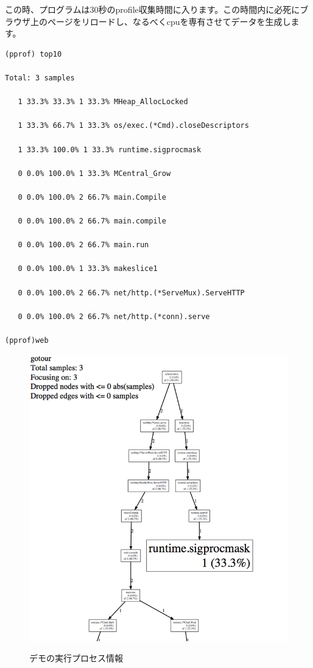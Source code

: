 この時、プログラムは30秒のprofile収集時間に入ります。この時間内に必死にブラウザ上のページをリロードし、なるべくcpuを専有させてデータを生成します。



\begin{lstlisting}[numbers=none]
(pprof) top10

Total: 3 samples

   1 33.3% 33.3% 1 33.3% MHeap_AllocLocked

   1 33.3% 66.7% 1 33.3% os/exec.(*Cmd).closeDescriptors

   1 33.3% 100.0% 1 33.3% runtime.sigprocmask

   0 0.0% 100.0% 1 33.3% MCentral_Grow

   0 0.0% 100.0% 2 66.7% main.Compile

   0 0.0% 100.0% 2 66.7% main.compile

   0 0.0% 100.0% 2 66.7% main.run

   0 0.0% 100.0% 1 33.3% makeslice1

   0 0.0% 100.0% 2 66.7% net/http.(*ServeMux).ServeHTTP

   0 0.0% 100.0% 2 66.7% net/http.(*conn).serve    

(pprof)web
\end{lstlisting}


\begin{figure}[H]
   \includegraphics[width=14cm]{14.6.pprof3.png}
   \label{図14.9}
   \caption{デモの実行プロセス情報}
\end{figure}

